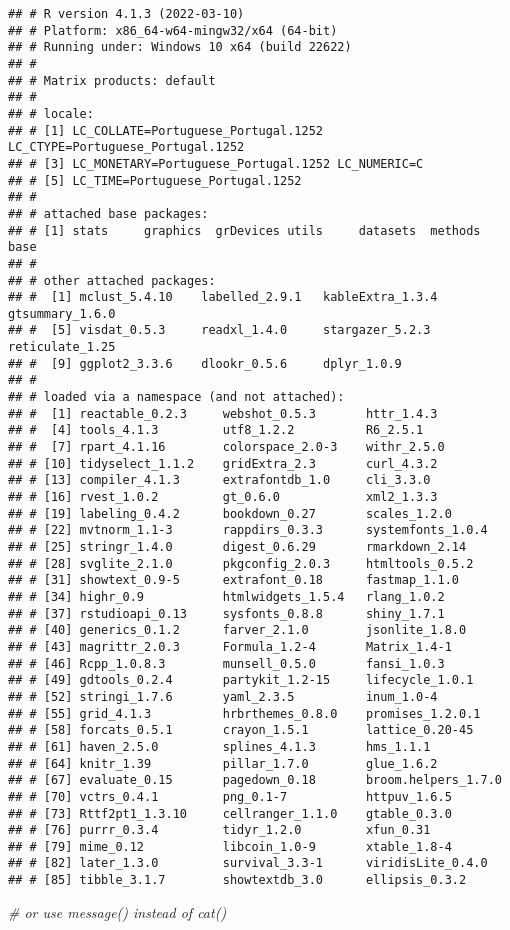 \documentclass[
  12pt,
]{article}
\newenvironment{Shaded}{\begin{snugshade}}{\end{snugshade}}
\newcommand{\CommentTok}[1]{\textcolor[rgb]{0.56,0.35,0.01}{\textit{#1}}}
\begin{document}
\begin{verbatim}
## # R version 4.1.3 (2022-03-10) 
## # Platform: x86_64-w64-mingw32/x64 (64-bit) 
## # Running under: Windows 10 x64 (build 22622) 
## #  
## # Matrix products: default 
## #  
## # locale: 
## # [1] LC_COLLATE=Portuguese_Portugal.1252  LC_CTYPE=Portuguese_Portugal.1252    
## # [3] LC_MONETARY=Portuguese_Portugal.1252 LC_NUMERIC=C                         
## # [5] LC_TIME=Portuguese_Portugal.1252     
## #  
## # attached base packages: 
## # [1] stats     graphics  grDevices utils     datasets  methods   base      
## #  
## # other attached packages: 
## #  [1] mclust_5.4.10    labelled_2.9.1   kableExtra_1.3.4 gtsummary_1.6.0  
## #  [5] visdat_0.5.3     readxl_1.4.0     stargazer_5.2.3  reticulate_1.25  
## #  [9] ggplot2_3.3.6    dlookr_0.5.6     dplyr_1.0.9      
## #  
## # loaded via a namespace (and not attached): 
## #  [1] reactable_0.2.3     webshot_0.5.3       httr_1.4.3          
## #  [4] tools_4.1.3         utf8_1.2.2          R6_2.5.1            
## #  [7] rpart_4.1.16        colorspace_2.0-3    withr_2.5.0         
## # [10] tidyselect_1.1.2    gridExtra_2.3       curl_4.3.2          
## # [13] compiler_4.1.3      extrafontdb_1.0     cli_3.3.0           
## # [16] rvest_1.0.2         gt_0.6.0            xml2_1.3.3          
## # [19] labeling_0.4.2      bookdown_0.27       scales_1.2.0        
## # [22] mvtnorm_1.1-3       rappdirs_0.3.3      systemfonts_1.0.4   
## # [25] stringr_1.4.0       digest_0.6.29       rmarkdown_2.14      
## # [28] svglite_2.1.0       pkgconfig_2.0.3     htmltools_0.5.2     
## # [31] showtext_0.9-5      extrafont_0.18      fastmap_1.1.0       
## # [34] highr_0.9           htmlwidgets_1.5.4   rlang_1.0.2         
## # [37] rstudioapi_0.13     sysfonts_0.8.8      shiny_1.7.1         
## # [40] generics_0.1.2      farver_2.1.0        jsonlite_1.8.0      
## # [43] magrittr_2.0.3      Formula_1.2-4       Matrix_1.4-1        
## # [46] Rcpp_1.0.8.3        munsell_0.5.0       fansi_1.0.3         
## # [49] gdtools_0.2.4       partykit_1.2-15     lifecycle_1.0.1     
## # [52] stringi_1.7.6       yaml_2.3.5          inum_1.0-4          
## # [55] grid_4.1.3          hrbrthemes_0.8.0    promises_1.2.0.1    
## # [58] forcats_0.5.1       crayon_1.5.1        lattice_0.20-45     
## # [61] haven_2.5.0         splines_4.1.3       hms_1.1.1           
## # [64] knitr_1.39          pillar_1.7.0        glue_1.6.2          
## # [67] evaluate_0.15       pagedown_0.18       broom.helpers_1.7.0 
## # [70] vctrs_0.4.1         png_0.1-7           httpuv_1.6.5        
## # [73] Rttf2pt1_1.3.10     cellranger_1.1.0    gtable_0.3.0        
## # [76] purrr_0.3.4         tidyr_1.2.0         xfun_0.31           
## # [79] mime_0.12           libcoin_1.0-9       xtable_1.8-4        
## # [82] later_1.3.0         survival_3.3-1      viridisLite_0.4.0   
## # [85] tibble_3.1.7        showtextdb_3.0      ellipsis_0.3.2
\end{verbatim}

\begin{Shaded}
\begin{Highlighting}[]
  \CommentTok{\# or use message() instead of cat()}
\end{Highlighting}
\end{Shaded}
\end{document}
